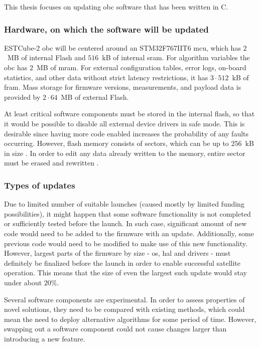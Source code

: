 This thesis focuses on updating \gls{obc} software that has been written in C.

\subsubsection{Hardware, on which the software will be updated}\label{s:hardware}

ESTCube-2 \gls{obc} will be centered around an STM32F767IIT6 \gls{mcu}, which has $2$~MB of internal Flash and $516$~kB of internal \gls{sram}. For algorithm variables the \gls{obc} has $2$~MB of \gls{mram}. For external configuration tables, error logs, on-board statistics, and other data without strict latency restrictions, it has $3\cdot512$~kB of \gls{fram}. Mass storage for firmware versions, measurements, and payload data is provided by $2\cdot64$~MB of external Flash.
\cite{Haljaste2017}

At least critical software components must be stored in the internal flash, so that it would be possible to disable all external device drivers in safe mode. This is desirable since having more code enabled increases the probability of any faults occurring. However, flash memory consists of sectors, which can be up to 256~kB in size \cite{STMicroelectronics2018}. In order to edit any data already written to the memory, entire sector must be erased and rewritten \cite{STMicroelectronics2018}.

\subsubsection{Types of updates}

Due to limited number of suitable launches (caused mostly by limited funding possibilities), it might happen that some software functionality is not completed or sufficiently tested before the launch. In such case, significant amount of new code would need to be added to the firmware with an update. Additionally, some previous code would need to be modified to make use of this new functionality. However, largest parts of the firmware by size - \gls{os}, \gls{hal} and drivers - must definitely be finalized before the launch in order to enable successful satellite operation. This means that the size of even the largest such update would stay under about $20\%$.

Several software components are experimental. In order to assess properties of novel solutions, they need to be compared with existing methods, which could mean the need to deploy alternative algorithms for some period of time. However, swapping out a software component could not cause changes larger than introducing a new feature.

